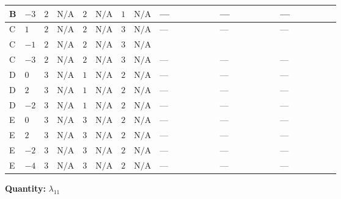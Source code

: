 \documentclass[8pt]{article}
\begin{document}
\begin{landscape}
\begin{longtable}{@{}llcccccc >{\raggedright\arraybackslash}p{0.21\linewidth} >{\raggedright\arraybackslash}p{0.21\linewidth} >{\raggedright\arraybackslash}p{0.21\linewidth}@{}}
\midrule
B & $-3$ & $2$ & $\text{N/A}$ & $2$ & $\text{N/A}$ & $1$ & $\text{N/A}$ & --- & --- & --- \\
\midrule
C & $1$ & $2$ & $\text{N/A}$ & $2$ & $\text{N/A}$ & $3$ & $\text{N/A}$ & --- & --- & --- \\
\midrule
C & $-1$ & $2$ & $\text{N/A}$ & $2$ & $\text{N/A}$ & $3$ & $\text{N/A}$ & \scriptsize\adjustbox{max width=\linewidth}{$\begin{gathered} +{\lambda_{12}^{(1)}} (6 {\lambda_{10}}+6 {\lambda_{11}})\end{gathered}$} & \scriptsize\adjustbox{max width=\linewidth}{$\begin{gathered} +{\lambda_{12}^{(A)}} \left(-\frac{{\lambda_{10}}}{2}-\frac{5 {\lambda_{11}}}{2}\right)\end{gathered}$} & \scriptsize\adjustbox{max width=\linewidth}{$\begin{gathered} +{\lambda_{HS_1}^{(1)}} (2 {\lambda_{H H^\dagger S_1^\dagger S_2^\dagger}^{\rm Cross}}-2 {\lambda_{X_{17}}^{(1)}})\end{gathered}$} \\
\midrule
C & $-3$ & $2$ & $\text{N/A}$ & $2$ & $\text{N/A}$ & $3$ & $\text{N/A}$ & --- & --- & --- \\
\midrule
D & $0$ & $3$ & $\text{N/A}$ & $1$ & $\text{N/A}$ & $2$ & $\text{N/A}$ & --- & --- & --- \\
\midrule
D & $2$ & $3$ & $\text{N/A}$ & $1$ & $\text{N/A}$ & $2$ & $\text{N/A}$ & --- & --- & --- \\
\midrule
D & $-2$ & $3$ & $\text{N/A}$ & $1$ & $\text{N/A}$ & $2$ & $\text{N/A}$ & --- & --- & --- \\
\midrule
E & $0$ & $3$ & $\text{N/A}$ & $3$ & $\text{N/A}$ & $2$ & $\text{N/A}$ & --- & --- & --- \\
\midrule
E & $2$ & $3$ & $\text{N/A}$ & $3$ & $\text{N/A}$ & $2$ & $\text{N/A}$ & --- & --- & --- \\
\midrule
E & $-2$ & $3$ & $\text{N/A}$ & $3$ & $\text{N/A}$ & $2$ & $\text{N/A}$ & --- & --- & --- \\
\midrule
E & $-4$ & $3$ & $\text{N/A}$ & $3$ & $\text{N/A}$ & $2$ & $\text{N/A}$ & --- & --- & --- \\
\midrule
\bottomrule
\end{longtable}
\clearpage
\noindent\textbf{Quantity: }$\lambda_{11}$\par\smallskip

\end{landscape}
\end{document}
